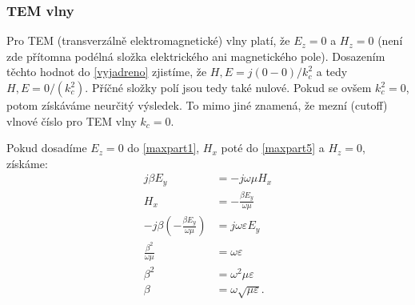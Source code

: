 \documentclass[12pt,a4paper,oneside]{article}
\numberwithin{equation}{section} %
\numberwithin{figure}{section} %
\numberwithin{table}{section} %
\renewcommand{\vec}[1]{\mbox{\boldmath$#1$}} %
\begin{document}
\subsubsection{TEM vlny}
Pro TEM (transverzálně elektromagnetické) vlny platí, že $E_z = 0$ a $H_z = 0$ (není zde přítomna podélná složka elektrického ani magnetického pole). Dosazením těchto hodnot do \ref{vyjadreno} zjistíme, že $H, E = j (0-0) / k^2_c$ a tedy $H, E = 0 / (k^2_c)$. Příčné složky polí jsou tedy také nulové. Pokud se ovšem $k^2_c = 0$, potom získáváme neurčitý výsledek. To mimo jiné znamená, že mezní (cutoff) vlnové číslo pro TEM vlny $k_c = 0$.

Pokud dosadíme $E_z = 0$ do \ref{maxpart1}, $H_x$ poté do \ref{maxpart5} a $H_z = 0$, získáme:
\begin{align*}
j \beta E_y &= -j \omega \mu H_x
\\
H_x &= - \frac{\beta E_y}{\omega \mu}
\\
-j \beta \left( - \frac{\beta E_y}{\omega \mu} \right) &= j \omega \varepsilon E_y
\\
\frac{\beta ^2}{\omega \mu} &= \omega \varepsilon
\\
\beta ^2 &= \omega ^2 \mu \varepsilon
\\
\beta &= \omega \sqrt{\mu \varepsilon} .
\end{align*}

\end{document}
